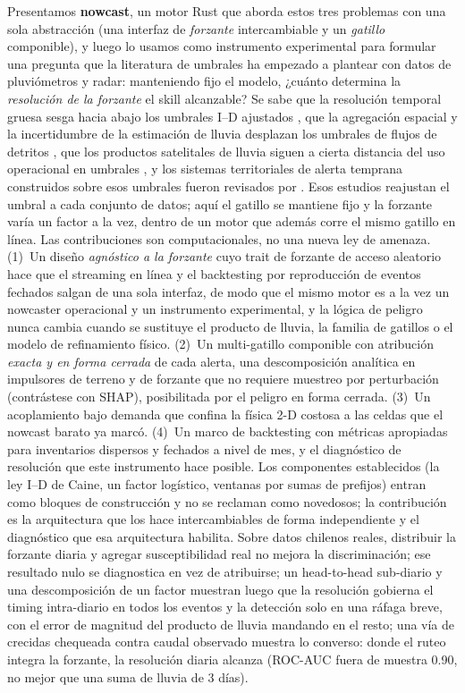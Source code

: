 \documentclass[authoryear,preprint,review,12pt]{elsarticle}
\begin{document}
Presentamos \textbf{nowcast}, un motor Rust que aborda estos tres problemas con
una sola abstracción (una interfaz de \emph{forzante} intercambiable y un
\emph{gatillo} componible), y luego lo usamos como instrumento experimental para
formular una pregunta que la literatura de umbrales ha empezado a plantear con datos de pluviómetros y radar: manteniendo fijo el
modelo, ¿cuánto determina la \emph{resolución de la forzante} el skill
alcanzable? Se sabe que la resolución temporal gruesa sesga hacia abajo los umbrales I--D ajustados \citep{marra2019,gariano2020}, que la agregación espacial y la incertidumbre de la estimación de lluvia desplazan los umbrales de flujos de detritos \citep{marra2017,nikolopoulos2014}, que los productos satelitales de lluvia siguen a cierta distancia del uso operacional en umbrales \citep{brunetti2018}, y los sistemas territoriales de alerta temprana construidos sobre esos umbrales fueron revisados por \citet{piciullo2018}. Esos estudios reajustan el umbral a cada conjunto de datos; aquí el gatillo se mantiene fijo y la forzante varía un factor a la vez, dentro de un motor que además corre el mismo gatillo en línea. Las contribuciones son computacionales, no una nueva ley de amenaza.
(1)~Un diseño \emph{agnóstico a la forzante} cuyo trait de forzante de acceso
aleatorio hace que el streaming en línea y el backtesting por reproducción de
eventos fechados salgan de una sola interfaz, de modo que el mismo motor es a la
vez un nowcaster operacional y un instrumento experimental, y la lógica de peligro
nunca cambia cuando se sustituye el producto de lluvia, la familia de gatillos o
el modelo de refinamiento físico. (2)~Un multi-gatillo componible con atribución
\emph{exacta y en forma cerrada} de cada alerta, una descomposición analítica en
impulsores de terreno y de forzante que no requiere muestreo por perturbación
(contrástese con SHAP), posibilitada por el peligro en forma cerrada. (3)~Un
acoplamiento bajo demanda que confina la física 2-D costosa a las celdas que el
nowcast barato ya marcó. (4)~Un marco de backtesting con métricas apropiadas para
inventarios dispersos y fechados a nivel de mes, y el diagnóstico de resolución
que este instrumento hace posible. Los componentes establecidos (la ley I--D de
Caine, un factor logístico, ventanas por sumas de prefijos) entran como bloques de
construcción y no se reclaman como novedosos; la contribución es la arquitectura
que los hace intercambiables de forma independiente y el diagnóstico que esa
arquitectura habilita. Sobre datos chilenos reales, distribuir la forzante diaria
y agregar susceptibilidad real no mejora la discriminación; ese resultado nulo
se diagnostica en vez de atribuirse; un head-to-head sub-diario y una descomposición de un factor muestran luego que la resolución gobierna el timing intra-diario en todos los eventos y la detección solo en una ráfaga breve, con el error de magnitud del producto de lluvia mandando en el resto; una vía de crecidas chequeada
contra caudal observado muestra lo converso: donde el ruteo integra la forzante,
la resolución diaria alcanza (ROC-AUC fuera de muestra 0.90, no mejor que una suma de lluvia de 3 días).
\end{document}
